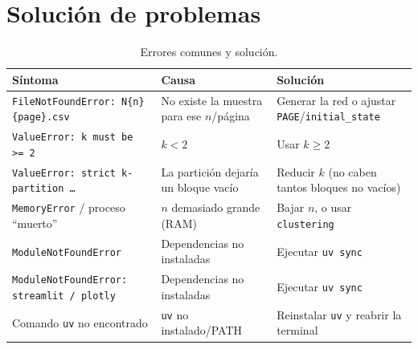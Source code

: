\documentclass[11pt,letterpaper]{article}
\begin{document}


\section{Solución de problemas}

\begin{table}[H]
	\centering\small
	\caption{Errores comunes y solución.}
	\begin{tabular}{@{}p{4.4cm}p{4.0cm}p{4.6cm}@{}}
		\toprule
		Síntoma                                          & Causa                                    & Solución                                                       \\
		\midrule
		\texttt{FileNotFoundError: N\{n\}\{page\}.csv}   & No existe la muestra para ese $n$/página & Generar la red o ajustar \texttt{PAGE}/\texttt{initial\_state} \\
		\texttt{ValueError: k must be >= 2}              & $k<2$                                    & Usar $k\ge 2$                                                  \\
		\texttt{ValueError: strict k-partition \dots}    & La partición dejaría un bloque vacío     & Reducir $k$ (no caben tantos bloques no vacíos)                \\
		\texttt{MemoryError} / proceso ``muerto''        & $n$ demasiado grande (RAM)               & Bajar $n$, o usar \texttt{clustering}                          \\
		\texttt{ModuleNotFoundError}                     & Dependencias no instaladas               & Ejecutar \texttt{uv sync}                                      \\
		\texttt{ModuleNotFoundError: streamlit / plotly} & Dependencias no instaladas               & Ejecutar \texttt{uv sync}                                      \\
		Comando \texttt{uv} no encontrado                & \texttt{uv} no instalado/PATH            & Reinstalar \texttt{uv} y reabrir la terminal                   \\
		\bottomrule
	\end{tabular}
\end{table}
\end{document}
